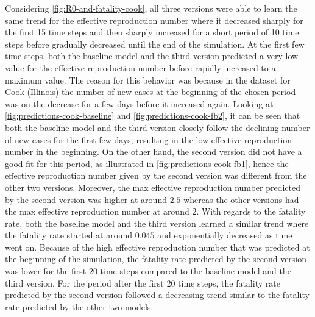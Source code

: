 Considering \autoref{fig:R0-and-fatality-cook}, all three versions were able to learn the same trend for the effective reproduction number where it decreased sharply for the first 15 time steps and then sharply increased for a short period of 10 time steps before gradually decreased until the end of the simulation.
At the first few time steps, both the baseline model and the third version predicted a very low value for the effective reproduction number before rapidly increased to a maximum value.
The reason for this behavior was because in the dataset for Cook (Illinois) the number of new cases at the beginning of the chosen period was on the decrease for a few days before it increased again.
Looking at \autoref{fig:predictions-cook-baseline} and \autoref{fig:predictions-cook-fb2}, it can be seen that both the baseline model and the third version closely follow the declining number of new cases for the first few days, resulting in the low effective reproduction number in the beginning.
On the other hand, the second version did not have a good fit for this period, as illustrated in \autoref{fig:predictions-cook-fb1}, hence the effective reproduction number given by the second version was different from the other two versions.
Moreover, the max effective reproduction number predicted by the second version was higher at around $2.5$ whereas the other versions had the max effective reproduction number at around $2$.
With regards to the fatality rate, both the baseline model and the third version learned a similar trend where the fatality rate started at around $0.045$ and exponentially decreased as time went on.
Because of the high effective reproduction number that was predicted at the beginning of the simulation, the fatality rate predicted by the second version was lower for the first $20$ time steps compared to the baseline model and the third version.
For the period after the first $20$ time steps, the fatality rate predicted by the second version followed a decreasing trend similar to the fatality rate predicted by the other two models.

